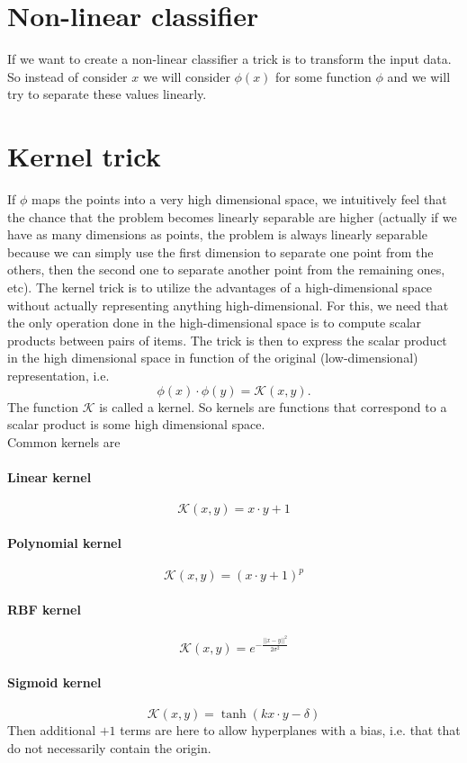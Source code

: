 \documentclass{article}
\begin{document}
\section{Non-linear classifier}
If we want to create a non-linear classifier a trick is to transform the input data. So instead of consider $x$ we will consider $\phi(x)$ for some function $\phi$ and we will try to separate these values linearly.

\section{Kernel trick}
If $\phi$ maps the points into a very high dimensional space, we intuitively feel that the chance that the problem becomes linearly separable are higher (actually if we have as many dimensions as points, the problem is always linearly separable because we can simply use the first dimension to separate one point from the others, then the second one to separate another point from the remaining ones, etc). The kernel trick is to utilize the advantages of a high-dimensional space without actually representing anything high-dimensional. For this, we need that the only operation done in the high-dimensional space is to compute scalar products between pairs of items. The trick is then to express the scalar product in the high dimensional space in function of the original (low-dimensional) representation, i.e.
$$\phi(x) \cdot \phi(y) = \mathcal{K}(x,y).$$
The function $\mathcal{K}$ is called a kernel. So kernels are functions that correspond to a scalar product is some high dimensional space.\\

Common kernels are
\paragraph{Linear kernel}
$$\mathcal{K}(x,y) = x \cdot y + 1$$
\paragraph{Polynomial kernel}
$$\mathcal{K}(x,y) = (x \cdot y + 1)^p$$
\paragraph{RBF kernel}
$$\mathcal{K}(x,y) = e^{-\frac{||x-y||^2}{2\sigma^2}}$$
\paragraph{Sigmoid kernel}
$$\mathcal{K}(x,y)  = \tanh(k x \cdot y - \delta)$$
Then additional $+1$ terms are here to allow hyperplanes with a bias, i.e. that that do not necessarily contain the origin.\\
\end{document}
